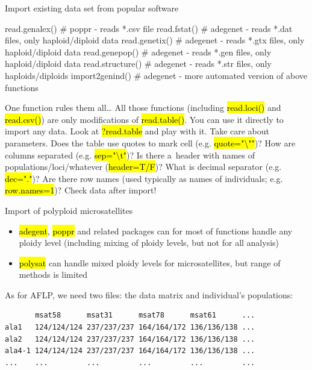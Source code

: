 \documentclass[compress, ucs, xelatex, 11pt, xcolor=svgnames,
  hyperref={
    bookmarks=true,
    unicode=true,
    colorlinks=true,
    pdftitle={Molecular data in R},
    plainpages=false,
    pdfauthor={Vojtech Zeisek},
    pdfsubject={Course about phylogeny and evolution in R},
    pdfcreator={XeLaTeX},
    pdfkeywords={R, evolution, phylogeny, molecular data},
    linkcolor=Tomato,
    anchorcolor=SaddleBrown,
    citecolor=Goldenrod,
    filecolor=DarkMagenta,
    menucolor=Sienna,
    urlcolor=DarkTurquoise,
    pdftex},
  url={hyphens, lowtilde} %
  ]{beamer}
\renewcommand{\texttt}[1]{\hl{\ttfamily #1}}
\begin{document}
\begin{frame}[fragile]{Import existing data set from popular software}
  \begin{spluscode}
    read.genalex() # poppr - reads *.csv file
    read.fstat() # adegenet - reads *.dat files, only haploid/diploid data
    read.genetix() # adegenet - reads *.gtx files, only haploid/diploid data
    read.genepop() # adegenet - reads *.gen files, only haploid/diploid data
    read.structure() # adegenet - reads *.str files, only haploids/diploids
    import2genind() # adegenet - more automated version of above functions
  \end{spluscode}
\begin{block}{One function rules them all\ldots}
  All those functions (including \texttt{read.loci()} and \texttt{read.csv()}) are only modifications of \texttt{read.table()}. You can use it directly to import any data. Look at \texttt{?read.table} and play with it. Take care about parameters. Does the table use quotes to mark cell (e.g. \texttt{quote="\textbackslash ""})? How are columns separated (e.g. \texttt{sep="\textbackslash t"})? Is there a~header with names of populations/loci/whatever (\texttt{header=T/F})? What is decimal separator (e.g. \texttt{dec="."})? Are there row names (used typically as names of individuals; e.g. \texttt{row.names=1})? Check data after import!
\end{block}
\end{frame}

\begin{frame}[fragile]{Import of polyploid microsatellites}
\begin{itemize}
 \item \texttt{adegent}, \texttt{poppr} and related packages can for most of functions handle any ploidy level (including mixing of ploidy levels, but not for all analysis)
 \item \texttt{polysat} can handle mixed ploidy levels for microsatellites, but range of methods is limited
\end{itemize}
As for AFLP, we need two files: the data matrix and individual's populations:
\begin{verbatim}
       msat58      msat31      msat78      msat61      ...
ala1   124/124/124 237/237/237 164/164/172 136/136/138 ...
ala2   124/124/124 237/237/237 164/164/172 136/136/138 ...
ala4-1 124/124/124 237/237/237 164/164/172 136/136/138 ...
...    ...         ...         ...         ...         ...
\end{verbatim}
\end{frame}
\end{document}
